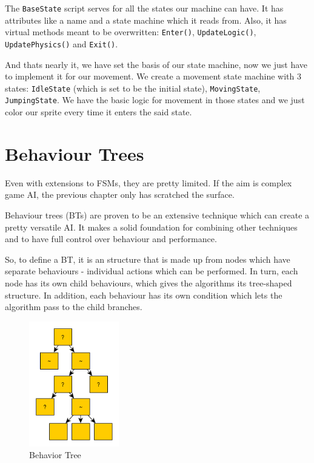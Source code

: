 \documentclass[a4paper, 12pt]{book}
\begin{document}
The \texttt{BaseState} script serves for all the states our machine can have. It has attributes like a name and a state machine which it reads from. Also, it has virtual methods meant to be overwritten: \texttt{Enter()}, \texttt{UpdateLogic()}, \texttt{UpdatePhysics()} and \texttt{Exit()}.

And thats nearly it, we have set the basis of our state machine, now we just have to implement it for our movement. We create a movement state machine with 3 states: \texttt{IdleState} (which is set to be the initial state), \texttt{MovingState}, \texttt{JumpingState}. We have the basic logic for movement in those states and we just color our sprite every time it enters the said state.

\clearpage

\section{Behaviour Trees}

Even with extensions to FSMs, they are pretty limited. If the aim is complex game AI, the previous chapter only has scratched the surface.

Behaviour trees (BTs) \cite{BehaviourTreeStarterPack} are proven to be an extensive technique which can create a pretty versatile AI. It makes a solid foundation for combining other techniques and to have full control over behaviour and performance.

So, to define a BT, it is an structure that is made up from nodes which have separate behaviours - individual actions which can be performed. In turn, each node has its own child behaviours, which gives the algorithms its tree-shaped structure. In addition, each behaviour has its own condition which lets the algorithm pass to the child branches.

\begin{figure}[h]
\begin{center}
    \includegraphics[width=0.35\textwidth]{Images/behaviour_tree.png}
\end{center}
\caption{Behavior Tree \cite{behaviourTreeBlog}}
\label{pic3}
\end{figure}
\end{document}
